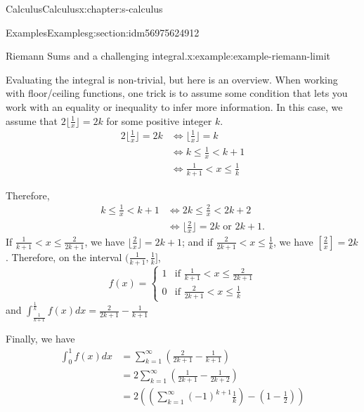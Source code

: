 \documentclass[twoside,10pt,]{book}
\numberwithin{equation}{section}
\newcommand{\lt}{<}
\begin{document}
\begin{chapterptx}{Calculus}{}{Calculus}{}{}{x:chapter:s-calculus}
\begin{sectionptx}{Examples}{}{Examples}{}{}{g:section:idm56975624912}
\begin{example}{Riemann Sums and a challenging integral.}{x:example:example-riemann-limit}
\par
Evaluating the integral is non-trivial, but here is an overview.  When working with floor\slash{}ceiling functions, one trick  is to assume some condition that lets you work with an equality or inequality to infer more information.  In this case, we assume that  \(2\lfloor \frac{1}{x}\rfloor =2k\) for some positive integer \(k\).%
\begin{equation*}
\begin{split}
2\lfloor \frac{1}{x}\rfloor =2k &\Leftrightarrow  \lfloor \frac{1}{x}\rfloor=k\\
& \Leftrightarrow k \leq \frac{1}{x} \lt k +1 \\
& \Leftrightarrow \frac{1}{k+1} \lt x \leq \frac{1}{k}
\end{split}
\end{equation*}
%
\par
Therefore,%
\begin{equation*}
\begin{split}
k \leq \frac{1}{x} \lt k +1  &\Leftrightarrow 2k \leq \frac{2}{x} \lt 2k +2 \\
&\Leftrightarrow  \lfloor \frac{2}{x} \rfloor = 2k \textrm{ or } 2k + 1.
\end{split}
\end{equation*}
If \(\frac{1}{k+1} \lt x \leq \frac{2}{2k+1}\), we have \(\lfloor \frac{2}{x}\rfloor = 2k+1\); and if \(\frac{2}{2k+1} \lt x \leq \frac{1}{k}\), we have \([\frac{2}{x}] = 2k\).  Therefore,  on the interval \((\frac{1}{k+1}, \frac{1}{k}]\),%
\begin{equation*}
f(x)=\begin{cases} 1 & \textrm{if } \frac{1}{k+1} \lt x \leq \frac{2}{2k+1}\\
0 & \textrm{if } \frac{2}{2k+1} \lt x \leq \frac{1}{k}
\end{cases}
\end{equation*}
and \(\int_{\frac{1}{k+1}}^{\frac{1}{k}} f(x) dx = \frac{2}{2k+1}-  \frac{1}{k+1}\)%
\par
Finally, we have%
\begin{equation*}
\begin{split}
\int_{0}^{1} f(x) dx & = \sum_{k=1}^{\infty} \left( \frac{2}{2k+1}-  \frac{1}{k+1} \right) \\
&  = 2 \sum_{k=1}^{\infty} \left( \frac{1}{2k+1} - \frac{1}{2k+2} \right) \\
&  = 2 \left(\left( \sum_{k=1}^{\infty} (-1)^{k+1}\frac{1}{k}\right)  - (1-\frac{1}{2}) \right)\\

\end{split}
\end{equation*}
\end{example}
\end{sectionptx}
\end{chapterptx}
\end{document}

